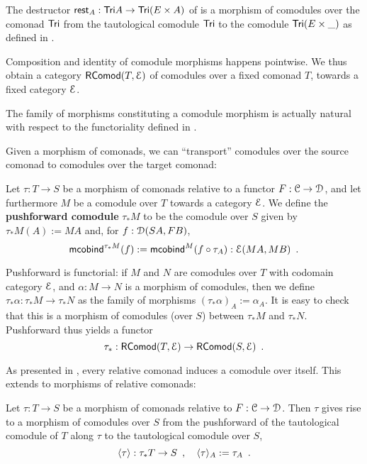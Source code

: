 \documentclass[a4paper,USenglish]{lipics}
\newcommand{\fat}[1]{\textbf{#1}}
\begin{document}
\begin{ex}\label{ex:tail_comodule}
 The destructor $\tail_A : \Tri A \to \Tri(E\times A)$ of  is a morphism of comodules over the comonad $\Tri$ 
  from the tautological comodule  $\Tri$ to the comodule $\Tri(E\times \_)$ as defined in .
\end{ex}

Composition and identity of comodule morphisms happens pointwise. We thus obtain a category $\RComod(T,\E)$
 of comodules
over a fixed comonad $T$, towards a fixed category $\E$.



\begin{Long}
\begin{rem}
  The family of morphisms constituting a comodule morphism is actually natural with respect to the functoriality 
  defined in .
\end{rem}
\end{Long}

Given a morphism of comonads, we can \enquote{transport} comodules over the source comonad to comodules over the target comonad:


\begin{defn}
\label{def:pushforward_comodule} 
  Let $\tau : T\to S$ be a morphism of comonads relative to a functor $F : \C \to \D$, and let furthermore $M$ be a 
  comodule over $T$ towards a category $\E$. We define the \fat{pushforward comodule} $\tau_*M$ to be the comodule over $S$ given by
  $  \tau_*M(A) := MA $
  and, for $f : \D(SA,FB)$,
   \[ \mcobind^{\tau_*M}(f) := \mcobind^M(\comp{\tau_A}{f}) : \E(MA,MB) \enspace . \]
   
  \noindent
  Pushforward is functorial: if $M$ and $N$ are comodules over $T$ with codomain category $\E$, and $\alpha : M\to N$ is 
    a morphism of comodules, then we define 
     $\tau_*\alpha : \tau_*M \to \tau_*N$
    as the family of morphisms
     $ (\tau_*\alpha)_A := \alpha_A$.
  It is easy to check that this is a morphism of comodules (over $S$) between $\tau_*M$ and $\tau_*N$.
  Pushforward thus yields a functor \[\tau_*:\RComod(T,\E) \to \RComod(S,\E) \enspace . \]
\end{defn}


As presented in , every relative comonad induces a comodule over itself.
This extends to morphisms of relative comonads:

\begin{defn}%
\label{def:induced} 
  Let $\tau : T\to S$ be a morphism of comonads relative to $F : \C \to \D$.
  Then $\tau$ gives rise to a morphism of comodules over $S$ from the pushforward of the tautological comodule
  of $T$ along $\tau$ to the tautological comodule over $S$,
  \[ \induced{\tau} : \tau_*T \to S \enspace , \quad \induced{\tau}_A := \tau_A \enspace . \]
\end{defn}
\end{document}
